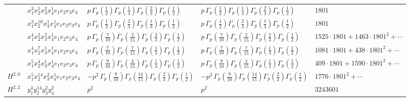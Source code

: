 \documentclass[11pt]{article}
\begin{document}
\begin{table}[ht]
{\begin{tabular}{@{}lllll@{}}
 & $x_{1}^{3} x_{2}^{5} x_{3}^{2} x_{4}^{1}  e_{1} e_{2} e_{3} e_{4}$ & $p \, \Gamma_p \left( \frac{1}{2} \right) \Gamma_p \left( \frac{1}{3} \right) \Gamma_p \left( \frac{2}{3} \right) \Gamma_p \left( \frac{1}{2} \right)$ & $p \, \Gamma_p \left( \frac{1}{2} \right) \Gamma_p \left( \frac{1}{3} \right) \Gamma_p \left( \frac{2}{3} \right) \Gamma_p \left( \frac{1}{2} \right)$ & $1801$ \\
 & $x_{1}^{3} x_{2}^{10} x_{3}^{1} x_{4}^{1}  e_{1} e_{2} e_{3} e_{4}$ & $p \, \Gamma_p \left( \frac{1}{2} \right) \Gamma_p \left( \frac{2}{3} \right) \Gamma_p \left( \frac{1}{3} \right) \Gamma_p \left( \frac{1}{2} \right)$ & $p \, \Gamma_p \left( \frac{1}{2} \right) \Gamma_p \left( \frac{2}{3} \right) \Gamma_p \left( \frac{1}{3} \right) \Gamma_p \left( \frac{1}{2} \right)$ & $1801$ \\
 & $x_{1}^{4} x_{2}^{2} x_{3}^{2} x_{4}^{1}  e_{1} e_{2} e_{3} e_{4}$ & $p \, \Gamma_p \left( \frac{7}{10} \right) \Gamma_p \left( \frac{2}{15} \right) \Gamma_p \left( \frac{2}{3} \right) \Gamma_p \left( \frac{1}{2} \right)$ & $p \, \Gamma_p \left( \frac{7}{10} \right) \Gamma_p \left( \frac{2}{15} \right) \Gamma_p \left( \frac{2}{3} \right) \Gamma_p \left( \frac{1}{2} \right)$ & $1525{\cdot}1801{+}1463{\cdot}1801^{2}{+}\cdots$ \\
 & $x_{1}^{4} x_{2}^{7} x_{3}^{1} x_{4}^{1}  e_{1} e_{2} e_{3} e_{4}$ & $p \, \Gamma_p \left( \frac{7}{10} \right) \Gamma_p \left( \frac{7}{15} \right) \Gamma_p \left( \frac{1}{3} \right) \Gamma_p \left( \frac{1}{2} \right)$ & $p \, \Gamma_p \left( \frac{7}{10} \right) \Gamma_p \left( \frac{7}{15} \right) \Gamma_p \left( \frac{1}{3} \right) \Gamma_p \left( \frac{1}{2} \right)$ & $1081{\cdot}1801{+}438{\cdot}1801^{2}{+}\cdots$ \\
 & $x_{1}^{5} x_{2}^{4} x_{3}^{1} x_{4}^{1}  e_{1} e_{2} e_{3} e_{4}$ & $p \, \Gamma_p \left( \frac{9}{10} \right) \Gamma_p \left( \frac{4}{15} \right) \Gamma_p \left( \frac{1}{3} \right) \Gamma_p \left( \frac{1}{2} \right)$ & $p \, \Gamma_p \left( \frac{9}{10} \right) \Gamma_p \left( \frac{4}{15} \right) \Gamma_p \left( \frac{1}{3} \right) \Gamma_p \left( \frac{1}{2} \right)$ & $409{\cdot}1801{+}1590{\cdot}1801^{2}{+}\cdots$ \\
\midrule
$H^{2,0}$ & $x_{1}^{5} x_{2}^{14} x_{3}^{2} x_{4}^{1}  e_{1} e_{2} e_{3} e_{4}$ & $- p^{2} \, \Gamma_p \left( \frac{9}{10} \right) \Gamma_p \left( \frac{14}{15} \right) \Gamma_p \left( \frac{2}{3} \right) \Gamma_p \left( \frac{1}{2} \right)$ & $- p^{2} \, \Gamma_p \left( \frac{9}{10} \right) \Gamma_p \left( \frac{14}{15} \right) \Gamma_p \left( \frac{2}{3} \right) \Gamma_p \left( \frac{1}{2} \right)$ & $1776{\cdot}1801^{2}{+}\cdots$ \\
\midrule
$H^{2,2}$ & $y_{1}^{4} y_{2}^{14} y_{3}^{2} y_{4}^{2}$ & $p^{2} \,$ & $p^{2} \,$ & $3243601$ \\
\bottomrule
\end{tabular}
}
\renewcommand{\arraystretch}{1.0}
\end{table}
\end{document}
